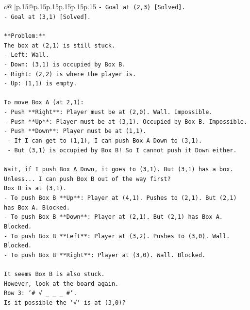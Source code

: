 \documentclass{article}
\begin{document}
{\begin{supertabular}{c@{$\;$}|p{.15\linewidth}@{}p{.15\linewidth}p{.15\linewidth}p{.15\linewidth}p{.15\linewidth}p{.15\linewidth}}
{{{\texttt{{-} Goal at (2,3) {[}Solved{]}.} \\
\texttt{{-} Goal at (3,1) {[}Solved{]}.} \\
\\ 
\texttt{**Problem:**} \\
\texttt{The box at (2,1) is still stuck.} \\
\texttt{{-} Left: Wall.} \\
\texttt{{-} Down: (3,1) is occupied by Box B.} \\
\texttt{{-} Right: (2,2) is where the player is.} \\
\texttt{{-} Up: (1,1) is empty.} \\
\\ 
\texttt{To move Box A (at 2,1):} \\
\texttt{{-} Push **Right**: Player must be at (2,0). Wall. Impossible.} \\
\texttt{{-} Push **Up**: Player must be at (3,1). Occupied by Box B. Impossible.} \\
\texttt{{-} Push **Down**: Player must be at (1,1).} \\
\texttt{  {-} If I can get to (1,1), I can push Box A Down to (3,1).} \\
\texttt{  {-} But (3,1) is occupied by Box B! So I cannot push it Down either.} \\
\\ 
\texttt{Wait, if I push Box A Down, it goes to (3,1). But (3,1) has a box.} \\
\texttt{Unless... I can push Box B out of the way first?} \\
\texttt{Box B is at (3,1).} \\
\texttt{{-} To push Box B **Up**: Player at (4,1). Pushes to (2,1). But (2,1) has Box A. Blocked.} \\
\texttt{{-} To push Box B **Down**: Player at (2,1). But (2,1) has Box A. Blocked.} \\
\texttt{{-} To push Box B **Left**: Player at (3,2). Pushes to (3,0). Wall. Blocked.} \\
\texttt{{-} To push Box B **Right**: Player at (3,0). Wall. Blocked.} \\
\\ 
\texttt{It seems Box B is also stuck.} \\
\texttt{However, look at the board again.} \\
\texttt{Row 3: `\# √ \_ \_ \_ \#`.} \\
\texttt{Is it possible the `√` is at (3,0)?} \\
}}}
\end{supertabular}}
\end{document}
